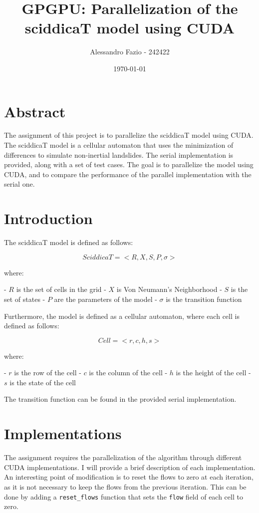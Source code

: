 \documentclass{article}
\title{GPGPU: Parallelization of the sciddicaT model using CUDA}
\author{Alessandro Fazio - 242422}
\date{\vfill\today}
\begin{document}
\maketitle
\newpage

\section{Abstract}
The assignment of this project is to parallelize the sciddicaT model using CUDA. The sciddicaT model is a cellular automaton that uses the minimization of differences to simulate non-inertial landslides. The serial implementation is provided, along with a set of test cases. The goal is to parallelize the model using CUDA, and to compare the performance of the parallel implementation with the serial one.

\section{Introduction}
The sciddicaT model is defined as follows:

$$
	SciddicaT = <R,X,S,P,\sigma>
$$

where:

- $R$ is the set of cells in the grid
- $X$ is Von Neumann's Neighborhood
- $S$ is the set of states
- $P$ are the parameters of the model
- $\sigma$ is the transition function

Furthermore, the model is defined as a cellular automaton, where each cell is defined as follows:

$$
	Cell = <r,c,h,s>
$$

where:

- $r$ is the row of the cell
- $c$ is the column of the cell
- $h$ is the height of the cell
- $s$ is the state of the cell

The transition function can be found in the provided serial implementation.

\newpage

\section{Implementations}
The assignment requires the parallelization of the algorithm through different CUDA implementations. I will provide a brief description of each implementation. 
An interesting point of modification is to reset the flows to zero at each iteration, as it is not necessary to keep the flows from the previous iteration. This can be done by adding a \texttt{reset\_flows} function that sets the \texttt{flow} field of each cell to zero.
\end{document}
